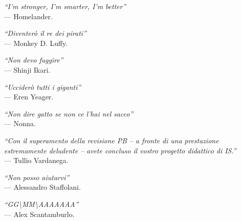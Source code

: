 \cleardoublepage
{}
{}

\begin{flushright}{
    \slshape
    ``I'm stronger, I'm smarter, I'm better''} \\
    \medskip
    --- Homelander.
\end{flushright}

\begin{flushright}{
    \slshape
    ``Diventerò il re dei pirati''} \\
    \medskip
    --- Monkey D. Luffy.
\end{flushright}

\begin{flushright}{
    \slshape
    ``Non devo fuggire''} \\
    \medskip
    --- Shinji Ikari.
\end{flushright}

\begin{flushright}{
    \slshape
    ``Ucciderò tutti i giganti''} \\
    \medskip
    --- Eren Yeager.
\end{flushright}

\begin{flushright}{
    \slshape
    ``Non dire gatto se non ce l'hai nel sacco''} \\
    \medskip
    --- Nonna.
\end{flushright}

\begin{flushright}{
    \slshape
    ``Con il superamento della revisione PB -- a fronte di una prestazione estremamente deludente -- avete concluso il vostro progetto didattico di IS.''} \\
    \medskip
    --- Tullio Vardanega.
\end{flushright}

\begin{flushright}{
    \slshape
    ``Non posso aiutarvi''} \\
    \medskip
    --- Alessandro Staffolani.
\end{flushright}

\begin{flushright}{
    \slshape
    ``GG\textbackslash{}MM\textbackslash{}AAAAAAA''} \\
    \medskip
    --- Alex Scantamburlo.
\end{flushright}


\bigskip

